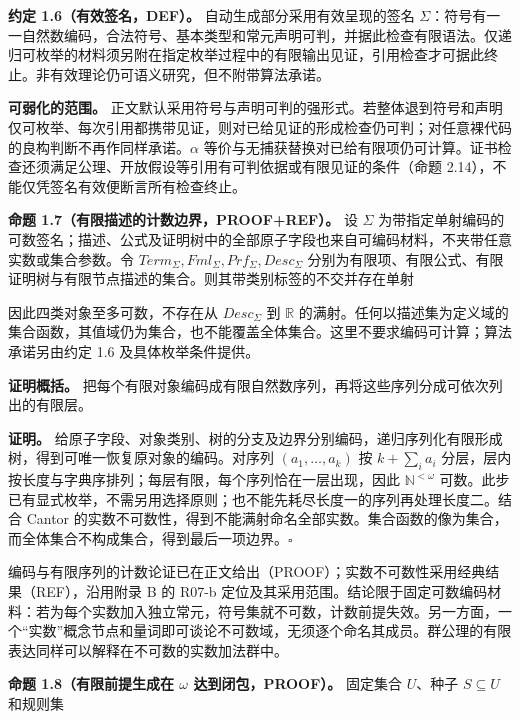 \documentclass[UTF8,a4paper,zihao=-4,fontset=windows,openany]{ctexbook}
\newcommand{\mcsdisplay}[1]{%
  \par\addvspace{0.7em}%
  \sbox{\mcsmathbox}{\ensuremath{\displaystyle #1}}%
  \ifdim\wd\mcsmathbox>\linewidth
    \noindent\resizebox{\linewidth}{!}{\usebox{\mcsmathbox}}%
  \else
    \noindent\hspace*{\fill}\usebox{\mcsmathbox}\hspace*{\fill}%
  \fi
  \par\addvspace{0.7em}%
}
\def\ensuremath#1{#1}%
\def\mathrm#1{#1}%
\begin{document}
\textbf{约定 1.6（有效签名，DEF）。} 自动生成部分采用有效呈现的签名 \(\Sigma\)：符号有一一自然数编码，合法符号、基本类型和常元声明可判，并据此检查有限语法。仅递归可枚举的材料须另附在指定枚举过程中的有限输出见证，引用检查才可据此终止。非有效理论仍可语义研究，但不附带算法承诺。

\textbf{可弱化的范围。} 正文默认采用符号与声明可判的强形式。若整体退到符号和声明仅可枚举、每次引用都携带见证，则对已给见证的形成检查仍可判；对任意裸代码的良构判断不再作同样承诺。\(\alpha\) 等价与无捕获替换对已给有限项仍可计算。证书检查还须满足公理、开放假设等引用有可判依据或有限见证的条件（命题 2.14），不能仅凭签名有效便断言所有检查终止。

\textbf{命题 1.7（有限描述的计数边界，PROOF+REF）。} 设 \(\Sigma\) 为带指定单射编码的可数签名；描述、公式及证明树中的全部原子字段也来自可编码材料，不夹带任意实数或集合参数。令 \(\mathrm{Term}_\Sigma,\mathrm{Fml}_\Sigma,\mathrm{Prf}_\Sigma,\mathrm{Desc}_\Sigma\) 分别为有限项、有限公式、有限证明树与有限节点描述的集合。则其带类别标签的不交并存在单射


\mcsdisplay{e:\ \mathrm{Term}_\Sigma\sqcup\mathrm{Fml}_\Sigma\sqcup\mathrm{Prf}_\Sigma\sqcup\mathrm{Desc}_\Sigma
\hookrightarrow\mathbb N^{<\omega},
\qquad \mathbb N^{<\omega}=\bigcup_{k<\omega}\mathbb N^k.}
\noindent 因此四类对象至多可数，不存在从 \(\mathrm{Desc}_\Sigma\) 到 \(\mathbb R\) 的满射。任何以描述集为定义域的集合函数，其值域仍为集合，也不能覆盖全体集合。这里不要求编码可计算；算法承诺另由约定 1.6 及具体枚举条件提供。

\textbf{证明概括。} 把每个有限对象编码成有限自然数序列，再将这些序列分成可依次列出的有限层。

\textbf{证明。} 给原子字段、对象类别、树的分支及边界分别编码，递归序列化有限形成树，得到可唯一恢复原对象的编码。对序列 \((a_1,\ldots,a_k)\) 按 \(k+\sum_i a_i\) 分层，层内按长度与字典序排列；每层有限，每个序列恰在一层出现，因此 \(\mathbb N^{<\omega}\) 可数。此步已有显式枚举，不需另用选择原则；也不能先耗尽长度一的序列再处理长度二。结合 Cantor 的实数不可数性，得到不能满射命名全部实数。集合函数的像为集合，而全体集合不构成集合，得到最后一项边界。\(\square\)

编码与有限序列的计数论证已在正文给出（PROOF）；实数不可数性采用经典结果（REF），沿用附录 B 的 R07-b 定位及其采用范围。结论限于固定可数编码材料：若为每个实数加入独立常元，符号集就不可数，计数前提失效。另一方面，一个“实数”概念节点和量词即可谈论不可数域，无须逐个命名其成员。群公理的有限表达同样可以解释在不可数的实数加法群中。

\textbf{命题 1.8（有限前提生成在 \(\omega\) 达到闭包，PROOF）。} 固定集合 \(U\)、种子 \(S\subseteq U\) 和规则集
\end{document}
